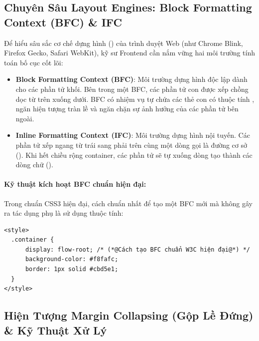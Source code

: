 \Needspace*{80pt}
\subsection{Chuyên Sâu Layout Engines: Block Formatting Context (BFC) \& IFC}

Để hiểu sâu sắc cơ chế dựng hình () của trình duyệt Web (như Chrome Blink, Firefox Gecko, Safari WebKit), kỹ sư Frontend cần nắm vững hai môi trường tính toán bố cục cốt lõi:

\begin{itemize}[leftmargin=1.8em, itemsep=3pt, parsep=0pt]
    \item \textbf{Block Formatting Context (BFC)}: Môi trường dựng hình độc lập dành cho các phần tử khối. Bên trong một BFC, các phần tử con được xếp chồng dọc từ trên xuống dưới. BFC có nhiệm vụ tự chứa các thẻ con có thuộc tính , ngăn hiện tượng tràn lề và ngăn chặn sự ảnh hưởng của các phần tử bên ngoài.
    \item \textbf{Inline Formatting Context (IFC)}: Môi trường dựng hình nội tuyến. Các phần tử xếp ngang từ trái sang phải trên cùng một dòng gọi là đường cơ sở (). Khi hết chiều rộng container, các phần tử sẽ tự xuống dòng tạo thành các dòng chữ ().
\end{itemize}

\paragraph{Kỹ thuật kích hoạt BFC chuẩn hiện đại:}
Trong chuẩn CSS3 hiện đại, cách chuẩn nhất để tạo một BFC mới mà không gây ra tác dụng phụ là sử dụng thuộc tính:
\begin{codeWindow}
\begin{lstlisting}[language=HTML5]
<style>
  .container {
      display: flow-root; /* (*@Cách tạo BFC chuẩn W3C hiện đại@*) */
      background-color: #f8fafc;
      border: 1px solid #cbd5e1;
  }
</style>
\end{lstlisting}
\end{codeWindow}

\Needspace*{80pt}
\subsection{Hiện Tượng Margin Collapsing (Gộp Lề Đứng) \& Kỹ Thuật Xử Lý}


